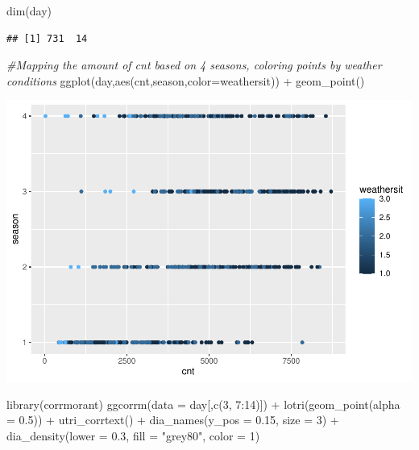 \documentclass[
]{article}
\newenvironment{Shaded}{\begin{snugshade}}{\end{snugshade}}
\newcommand{\AttributeTok}[1]{\textcolor[rgb]{0.77,0.63,0.00}{#1}}
\newcommand{\CommentTok}[1]{\textcolor[rgb]{0.56,0.35,0.01}{\textit{#1}}}
\newcommand{\DecValTok}[1]{\textcolor[rgb]{0.00,0.00,0.81}{#1}}
\newcommand{\FloatTok}[1]{\textcolor[rgb]{0.00,0.00,0.81}{#1}}
\newcommand{\FunctionTok}[1]{\textcolor[rgb]{0.00,0.00,0.00}{#1}}
\newcommand{\NormalTok}[1]{#1}
\newcommand{\SpecialCharTok}[1]{\textcolor[rgb]{0.00,0.00,0.00}{#1}}
\newcommand{\StringTok}[1]{\textcolor[rgb]{0.31,0.60,0.02}{#1}}
\begin{document}
\begin{Shaded}
\begin{Highlighting}[]
\FunctionTok{dim}\NormalTok{(day)}
\end{Highlighting}
\end{Shaded}

\begin{verbatim}
## [1] 731  14
\end{verbatim}

\begin{Shaded}
\begin{Highlighting}[]
\CommentTok{\#Mapping the amount of cnt based on 4 seasons, coloring points by weather conditions}
\FunctionTok{ggplot}\NormalTok{(day,}\FunctionTok{aes}\NormalTok{(cnt,season,}\AttributeTok{color=}\NormalTok{weathersit)) }\SpecialCharTok{+} \FunctionTok{geom\_point}\NormalTok{()}
\end{Highlighting}
\end{Shaded}

\includegraphics{ST-563-Final-Project_files/figure-latex/unnamed-chunk-1-1.pdf}

\begin{Shaded}
\begin{Highlighting}[]
\FunctionTok{library}\NormalTok{(corrmorant)}
\FunctionTok{ggcorrm}\NormalTok{(}\AttributeTok{data =}\NormalTok{ day[,}\FunctionTok{c}\NormalTok{(}\DecValTok{3}\NormalTok{, }\DecValTok{7}\SpecialCharTok{:}\DecValTok{14}\NormalTok{)]) }\SpecialCharTok{+}
  \FunctionTok{lotri}\NormalTok{(}\FunctionTok{geom\_point}\NormalTok{(}\AttributeTok{alpha =} \FloatTok{0.5}\NormalTok{)) }\SpecialCharTok{+}
  \FunctionTok{utri\_corrtext}\NormalTok{() }\SpecialCharTok{+}
  \FunctionTok{dia\_names}\NormalTok{(}\AttributeTok{y\_pos =} \FloatTok{0.15}\NormalTok{, }\AttributeTok{size =} \DecValTok{3}\NormalTok{) }\SpecialCharTok{+}
  \FunctionTok{dia\_density}\NormalTok{(}\AttributeTok{lower =} \FloatTok{0.3}\NormalTok{, }\AttributeTok{fill =} \StringTok{"grey80"}\NormalTok{, }\AttributeTok{color =} \DecValTok{1}\NormalTok{)}
\end{Highlighting}
\end{Shaded}
\end{document}
